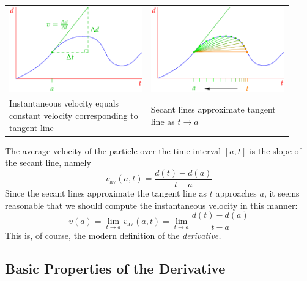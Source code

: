 \begin{center}
\begin{tabular}{p{0.46\linewidth}@{\qquad}p{0.46\linewidth}}
\includegraphics{diff-history}
&
\includegraphics{diff-history2}
\\
\centering Instantaneous velocity equals constant velocity corresponding to tangent line
&
\centering Secant lines approximate tangent line as $t\to a$
\end{tabular}
\end{center}

The average velocity of the particle over the time interval $[a,t]$ is the slope of the secant line, namely
\[v_\text{av}(a,t)=\frac{d(t)-d(a)}{t-a}\]
Since the secant lines approximate the tangent line as $t$ approaches $a$, it seems  reasonable that we should compute the instantaneous velocity in this manner:
\[v(a)=\lim_{t\to a}v_\text{av}(a,t)=\lim_{t\to a}\frac{d(t)-d(a)}{t-a}\]
This is, of course, the modern definition of the \emph{derivative.}\goodbreak

\setcounter{subsection}{27}
\subsection{Basic Properties of the Derivative}\label{sec:derivproperties}

